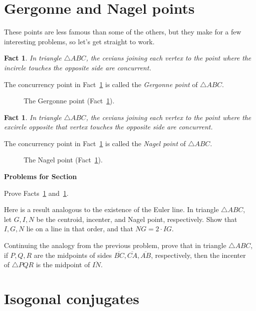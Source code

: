 \documentclass[12pt]{book}
\newcounter{exc}
\numberwithin{exc}{section}
\numberwithin{figure}{section}
\newenvironment{exer}{\vspace{0.1in}
\noindent \textbf{Problems for Section~\thesection} \vspace{0.1in}
\begin{list}{\arabic{exc}.}{\usecounter{exc}}}{\end{list}}
\newtheorem{fact}[theorem]{Fact}
\numberwithin{equation}{theorem}
\def\ii{\item}
\def\seg#1{\overline{#1}}
\begin{document}
\section{Gergonne and Nagel points}

These points are less famous than some of the others, but they make 
for a few interesting problems, so let's get straight to work.

\begin{fact} \label{fact:gergonne}
In triangle $\triangle ABC$, the cevians joining each vertex to
the point where the incircle touches the opposite side are concurrent.
\end{fact}
The concurrency point in Fact~\ref{fact:gergonne} is called the
\emph{Gergonne point}
of $\triangle ABC$. 
\begin{figure}[ht]
\caption{The Gergonne point (Fact~\ref{fact:gergonne}).}
\end{figure}

\begin{fact} \label{fact:nagel}
In triangle $\triangle ABC$, the cevians joining each vertex to
the point where the excircle opposite that vertex
touches the opposite side are concurrent.
\end{fact}
The concurrency point in Fact~\ref{fact:nagel} is called the
\emph{Nagel point}
of $\triangle ABC$.
\begin{figure}[ht]
\caption{The Nagel point (Fact~\ref{fact:nagel}).}
\end{figure}
 
\begin{exer}
\ii
Prove Facts~\ref{fact:gergonne} and~\ref{fact:nagel}.

\ii \label{ex:nagel}
Here is a result analogous to the existence of the Euler line.
In triangle $\triangle ABC$, let $G,I,N$ be the centroid, incenter, and Nagel 
point, respectively. Show that $I,G,N$ lie on a line in that order,
and that $NG = 
2\cdot IG$.

\ii
Continuing the analogy from the previous problem, prove that
in triangle $\triangle ABC$,
if $P,Q,R$ are the midpoints of sides $\seg{BC}, \seg{CA}, \seg{AB}$, 
respectively, then
the incenter of $\triangle PQR$ is the midpoint of $\seg{IN}$. 
\end{exer}

\section{Isogonal conjugates}
\end{document}
